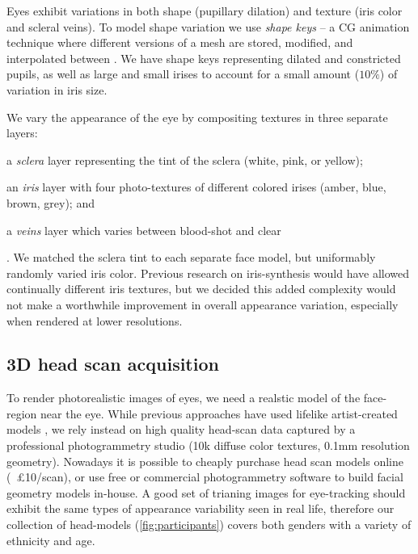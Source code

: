 Eyes exhibit variations in both shape (pupillary dilation) and texture (iris color and scleral veins). To model shape variation we use \emph{shape keys} -- a CG animation technique where different versions of a mesh are stored, modified, and interpolated between \cite{orvalho2012facial}.  We have shape keys representing dilated and constricted pupils, as well as large and small irises to account for a small amount ($10\%$) of variation in iris size.

We vary the appearance of the eye by compositing textures in three separate layers:
\begin{inparaenum}
\item a \emph{sclera} layer representing the tint of the sclera (white, pink, or yellow);
\item an \emph{iris} layer with four photo-textures of different colored irises (amber, blue, brown, grey); and
\item a \emph{veins} layer which varies between blood-shot and clear
\end{inparaenum}. We matched the sclera tint to each separate face model, but uniformably randomly varied iris color. Previous research on iris-synthesis  would have allowed continually different iris textures, but we decided this added complexity would not make a worthwhile improvement in overall appearance variation, especially when rendered at lower resolutions.

\subsection{3D head scan acquisition}



To render photorealistic images of eyes, we need a realstic model of the face-region near the eye. While previous approaches have used lifelike artist-created models \cite{swirski2014rendering}, we rely instead on high quality head-scan data captured by a professional photogrammetry studio (10k diffuse color textures, 0.1mm resolution geometry). Nowadays it is possible to cheaply purchase head scan models online (~£10/scan), or use free or commercial photogrammetry software to build facial geometry models in-house.
%
A good set of trianing images for eye-tracking should exhibit the same types of appearance variability seen in real life, therefore our collection of head-models (\autoref{fig:participants}) covers both genders with a variety of ethnicity and age.

